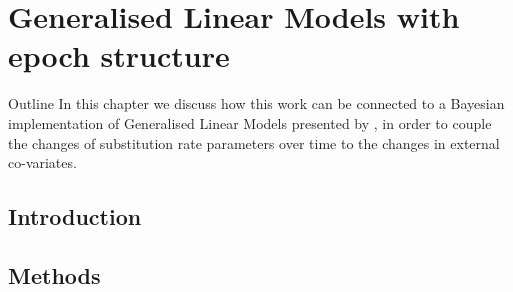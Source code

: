 \chapter{Generalised Linear Models with epoch structure\label{chap:five}}%

\begin{remark}{Outline}
In this chapter we discuss how this work can be connected to a Bayesian implementation of Generalised Linear Models presented by \citet{Lemey2014}, in order to couple the changes of substitution rate parameters over time to the changes in external co-variates.
\end{remark}

\section{Introduction}


\section{Methods}


